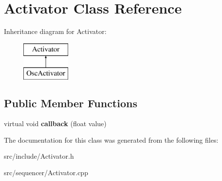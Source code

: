 \hypertarget{classActivator}{\section{Activator Class Reference}
\label{classActivator}
}
Inheritance diagram for Activator\-:\begin{figure}[H]
\begin{center}
\leavevmode
\includegraphics[height=2.000000cm]{classActivator}
\end{center}
\end{figure}
\subsection*{Public Member Functions}
\begin{DoxyCompactItemize}
\item 
\hypertarget{classActivator_ace74b175ffcc2ad9cc03f15a0e713743}{virtual void {\bfseries callback} (float value)}\label{classActivator_ace74b175ffcc2ad9cc03f15a0e713743}

\end{DoxyCompactItemize}


The documentation for this class was generated from the following files\-:\begin{DoxyCompactItemize}
\item 
src/include/Activator.\-h\item 
src/sequencer/Activator.\-cpp\end{DoxyCompactItemize}
